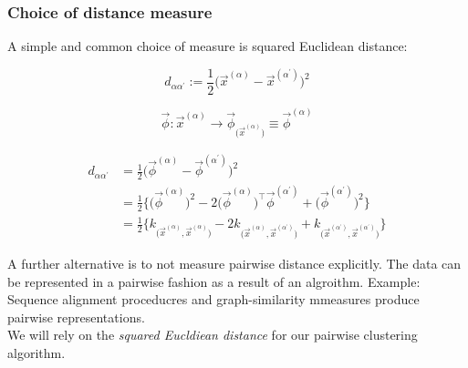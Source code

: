 \begin{frame}\frametitle{Choice of distance measure}

A simple and common choice of measure is squared Euclidean distance:

\begin{equation}
\label{eq:pairwisedisteuclidean}
d_{\alpha \alpha^{'}} := \frac{1}{2} \big(
    \vec{x}^{(\alpha)} - \vec{x}^{(\alpha^{'})} \big)^2
\end{equation}


$$
          \vec{\phi}: \vec{x}^{(\alpha)} \rightarrow
          \vec{\phi}_{\big( \vec{x}^{(\alpha)} \big)}
          \equiv \vec{\phi}^{(\alpha)}
$$

\begin{align}
			d_{\alpha \alpha^{'}} 
			& = \frac{1}{2} \big( \vec{\phi}^{(\alpha)} 
				- \vec{\phi}^{(\alpha^{'})} \big)^2 \\
			& = \frac{1}{2} \Big\{ \big( \vec{\phi}^{(\alpha)}
				\big)^2 - 2\big( \vec{\phi}^{(\alpha)} \big)^\top
				\vec{\phi}^{(\alpha^{'})} + \big(
				\vec{\phi}^{(\alpha^{'})} \big)^2 \Big\} \\
			& = \frac{1}{2} \bigg\{ k_{\big( \vec{x}^{(\alpha)},
				\vec{x}^{(\alpha)} \big)} 
				- 2k_{\big(\vec{x}^{(\alpha)},
				\vec{x}^{(\alpha^{'})} \big)}
				+ k_{\big(\vec{x}^{(\alpha^{'})},
				\vec{x}^{(\alpha^{'})} \big)}
				\bigg\}
\end{align}

\end{frame}

\begin{frame}

A further alternative is to not measure pairwise distance explicitly. The data can be represented in a pairwise fashion as a result of an algroithm. Example: Sequence alignment proceducres and graph-similarity mmeasures produce pairwise representations.\\

We will rely on the \emph{squared Eucldiean distance} for our pairwise clustering algorithm.

\end{frame}

